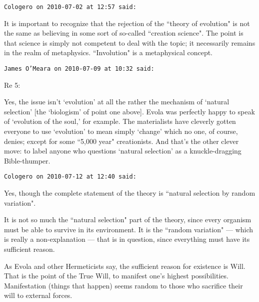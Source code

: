 \begin{footnotesize}\begin{sffamily}



\texttt{Cologero on 2010-07-02 at 12:57 said: }

It is important to recognize that the rejection of the ``theory of evolution" is not the same as believing in some sort of so-called ``creation science". The point is that science is simply not competent to deal with the topic; it necessarily remains in the realm of metaphysics. ``Involution" is a metaphysical concept.


\hfill

\texttt{James O'Meara on 2010-07-09 at 10:32 said: }

Re 5:

Yes, the issue isn't `evolution' at all the rather the mechanism of `natural selection’ [the `biologism' of point one above]. Evola was perfectly happy to speak of `evolution of the soul,' for example. The materialists have cleverly gotten everyone to use `evolution' to mean simply `change' which no one, of course, denies; except for some ``5,000 year" creationists. And that's the other clever move: to label anyone who questions `natural selection' as a knuckle-dragging Bible-thumper.


\hfill

\texttt{Cologero on 2010-07-12 at 12:40 said: }

Yes, though the complete statement of the theory is ``natural selection by random variation".

It is not so much the ``natural selection" part of the theory, since every organism must be able to survive in its environment. It is the ``random variation" — which is really a non-explanation — that is in question, since everything must have its sufficient reason.

As Evola and other Hermeticists say, the sufficient reason for existence is Will. That is the point of the True Will, to manifest one's highest possibilities. Manifestation (things that happen) seems random to those who sacrifice their will to external forces.


\end{sffamily}\end{footnotesize}

